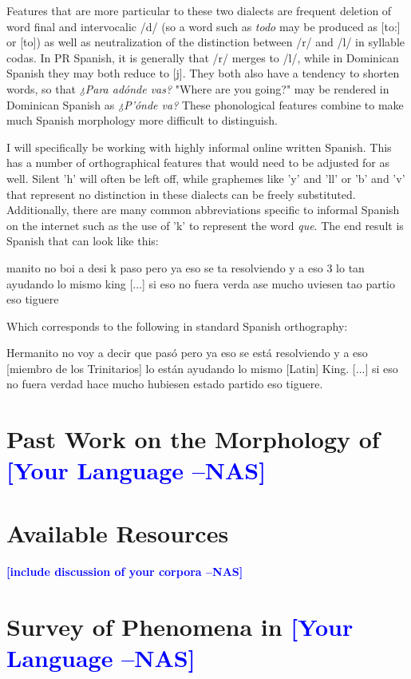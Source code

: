 \documentclass[11pt,letterpaper]{article}
\newcommand{\nascomment}[1]{\textcolor{blue}{\textbf{[#1 --NAS]}}}
\begin{document}
Features that are more particular to these two dialects are frequent deletion of word final and intervocalic /d/ (so a word such as \textit{todo} may be produced as [to:] or [to]) as well as neutralization of the distinction between /r/ and /l/ in syllable codas. In PR Spanish, it is generally that /r/ merges to /l/, while in Dominican Spanish they may both reduce to [j]. They both also have a tendency to shorten words, so that \textit{¿Para adónde vas?} "Where are you going?" may be rendered in Dominican Spanish as \textit{¿P'ónde va?} These phonological features combine to make much Spanish morphology more difficult to distinguish.

I will specifically be working with highly informal online written Spanish. This has a number of orthographical features that would need to be adjusted for as well. Silent 'h' will often be left off, while graphemes like 'y' and 'll' or 'b' and 'v' that represent no distinction in these dialects can be freely substituted. Additionally, there are many common abbreviations specific to informal Spanish on the internet such as the use of 'k' to represent the word \textit{que}. The end result is Spanish that can look like this:

manito no boi a desi k paso pero ya eso se ta resolviendo y a eso 3 lo tan ayudando lo mismo king [...] si eso no fuera verda ase mucho uviesen tao partio eso tiguere

Which corresponds to the following in standard Spanish orthography:

Hermanito no voy a decir que pasó pero ya eso se está resolviendo y a eso [miembro de los Trinitarios] lo están ayudando lo mismo [Latin] King. [...] si eso no fuera verdad hace mucho hubiesen estado partido eso tiguere.

\section{Past Work on the Morphology of \nascomment{Your Language}}

\section{Available Resources}

\nascomment{include discussion of your corpora}

\section{Survey of Phenomena in \nascomment{Your Language}}
\end{document}
